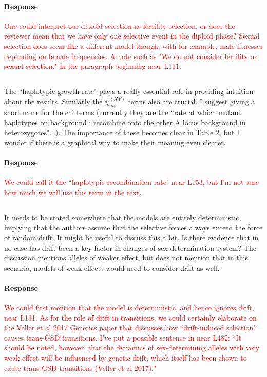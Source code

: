 \documentclass[10pt,letterpaper]{article}
\begin{document}
\noindent\paragraph{Response}
\textcolor{red}{One could interpret our diploid selection as fertility selection, or does the reviewer mean that we have only one selective event in the diploid phase? Sexual selection does seem like a different model though, with for example, male fitnesses depending on female frequencies. A note such as "We do not consider fertility or sexual selection." in the paragraph beginning near L111.}

\noindent\subsection{}
The ``haplotypic growth rate" plays a really essential role in providing intuition about the results. Similarly the $\chi_{mi}^{(XY)}$ terms also are crucial.  I suggest giving a short name for the chi terms (currently they are the ``rate at which mutant haplotypes on background i recombine onto the other A locus background in heterozygotes"...).   The importance of these becomes clear in Table 2, but I wonder if there is a graphical way to make their meaning even clearer.  

\noindent\paragraph{Response}
\textcolor{red}{We could call it the ``haplotypic recombination rate" near L153, but I'm not sure how much we will use this term in the text.}

\noindent\subsection{}
It needs to be stated somewhere that the models are entirely deterministic, implying that the authors assume that the selective forces always exceed the force of random drift. It might be useful to discuss this a bit. Is there evidence that in no case has drift been a key factor in changes of sex determination system?  The discussion mentions alleles of weaker effect, but does not mention that in this scenario, models of weak effects would need to consider drift as well.

\noindent\paragraph{Response}
\textcolor{red}{We could first mention that the model is deterministic, and hence ignores drift, near L131. As for the role of drift in transitions, we could certainly elaborate on the Veller et al 2017 Genetics paper that discusses how ``drift-induced selection" causes trans-GSD transitions. I've put a possible sentence in near L482: ``It should be noted, however, that the dynamics of sex-determining alleles with very weak effect will be influenced by genetic drift, which itself has been shown to cause trans-GSD transitions (Veller et al 2017)."}
\end{document}
